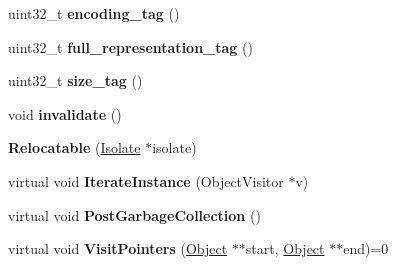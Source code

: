 \begin{DoxyCompactItemize}
\item 
uint32\+\_\+t {\bfseries encoding\+\_\+tag} ()\hypertarget{classv8_1_1internal_1_1_b_a_s_e___e_m_b_e_d_d_e_d_a773d0725d3fbb71936066d7eeb72a145}{}\label{classv8_1_1internal_1_1_b_a_s_e___e_m_b_e_d_d_e_d_a773d0725d3fbb71936066d7eeb72a145}

\item 
uint32\+\_\+t {\bfseries full\+\_\+representation\+\_\+tag} ()\hypertarget{classv8_1_1internal_1_1_b_a_s_e___e_m_b_e_d_d_e_d_a37bdee88822ef8bb93fc31ac4d84ba98}{}\label{classv8_1_1internal_1_1_b_a_s_e___e_m_b_e_d_d_e_d_a37bdee88822ef8bb93fc31ac4d84ba98}

\item 
uint32\+\_\+t {\bfseries size\+\_\+tag} ()\hypertarget{classv8_1_1internal_1_1_b_a_s_e___e_m_b_e_d_d_e_d_acf5b5402d89e8e33f6a35ddad90e3bdc}{}\label{classv8_1_1internal_1_1_b_a_s_e___e_m_b_e_d_d_e_d_acf5b5402d89e8e33f6a35ddad90e3bdc}

\item 
void {\bfseries invalidate} ()\hypertarget{classv8_1_1internal_1_1_b_a_s_e___e_m_b_e_d_d_e_d_a5e254f411c09f04bddfdd21a123fc15f}{}\label{classv8_1_1internal_1_1_b_a_s_e___e_m_b_e_d_d_e_d_a5e254f411c09f04bddfdd21a123fc15f}

\item 
{\bfseries Relocatable} (\hyperlink{classv8_1_1internal_1_1_isolate}{Isolate} $\ast$isolate)\hypertarget{classv8_1_1internal_1_1_b_a_s_e___e_m_b_e_d_d_e_d_aa36f504594ac28c39f98bd8bee6cdca2}{}\label{classv8_1_1internal_1_1_b_a_s_e___e_m_b_e_d_d_e_d_aa36f504594ac28c39f98bd8bee6cdca2}

\item 
virtual void {\bfseries Iterate\+Instance} (Object\+Visitor $\ast$v)\hypertarget{classv8_1_1internal_1_1_b_a_s_e___e_m_b_e_d_d_e_d_ac5071e3475bd318dabaabcd27012aba9}{}\label{classv8_1_1internal_1_1_b_a_s_e___e_m_b_e_d_d_e_d_ac5071e3475bd318dabaabcd27012aba9}

\item 
virtual void {\bfseries Post\+Garbage\+Collection} ()\hypertarget{classv8_1_1internal_1_1_b_a_s_e___e_m_b_e_d_d_e_d_aa8b5494cf4c1ece6d59cae2911721ca1}{}\label{classv8_1_1internal_1_1_b_a_s_e___e_m_b_e_d_d_e_d_aa8b5494cf4c1ece6d59cae2911721ca1}

\item 
virtual void {\bfseries Visit\+Pointers} (\hyperlink{classv8_1_1internal_1_1_object}{Object} $\ast$$\ast$start, \hyperlink{classv8_1_1internal_1_1_object}{Object} $\ast$$\ast$end)=0\hypertarget{classv8_1_1internal_1_1_b_a_s_e___e_m_b_e_d_d_e_d_aa000c8dba8907faa0486a399eab2138d}{}\label{classv8_1_1internal_1_1_b_a_s_e___e_m_b_e_d_d_e_d_aa000c8dba8907faa0486a399eab2138d}


\end{DoxyCompactItemize}

